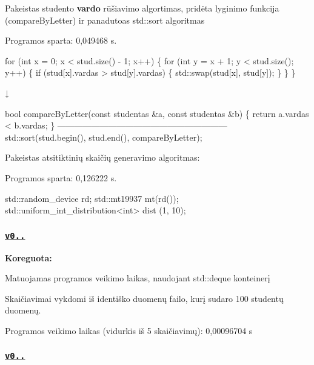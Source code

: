 \begin{DoxyItemize}
\item Pakeistas studento {\bfseries vardo} rūšiavimo algortimas, pridėta lyginimo funkcija ({\ttfamily compare\+By\+Letter}) ir panadutoas {\ttfamily std\+::sort} algoritmas
\begin{DoxyItemize}
\item Programos sparta\+: 0,049468 s. 
\begin{DoxyCode}
for (int x = 0; x < stud.size() - 1; x++)         
\{
  for (int y = x + 1; y < stud.size(); y++)
  \{  
    if (stud[x].vardas > stud[y].vardas)
    \{
      std::swap(stud[x], stud[y]);
    \}
  \}
\}

                    ↓

bool compareByLetter(const studentas &a, const studentas &b)
\{
    return a.vardas < b.vardas;
\}
------------------------------------------------------------
std::sort(stud.begin(), stud.end(), compareByLetter);
\end{DoxyCode}

\end{DoxyItemize}
\item Pakeistas atsitiktinių skaičių generavimo algoritmas\+:
\begin{DoxyItemize}
\item Programos sparta\+: 0,126222 s. 
\begin{DoxyCode}
std::random\_device rd;
  std::mt19937 mt(rd());
  std::uniform\_int\_distribution<int> dist (1, 10);
\end{DoxyCode}
 \subsubsection*{\href{https://github.com/KlauMack/Duomenu_apdorojimas/releases/tag/v0.5.3}{\tt v0..}}
\end{DoxyItemize}
\end{DoxyItemize}

{\bfseries Koreguota\+:}


\begin{DoxyItemize}
\item Matuojamas programos veikimo laikas, naudojant {\ttfamily std\+::deque} konteinerį
\item Skaičiavimai vykdomi iš identiško duomenų failo, kurį sudaro 100 studentų duomenų. 
\begin{DoxyCode}
Programos veikimo laikas (vidurkis iš 5 skaičiavimų): 0,00096704 s
\end{DoxyCode}
 \subsubsection*{\href{https://github.com/KlauMack/Duomenu_apdorojimas/releases/tag/v0.5.2}{\tt v0..}}
\end{DoxyItemize}

